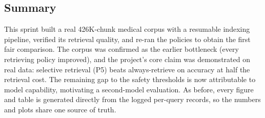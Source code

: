 \subsection{Summary}
\label{sec:week4-summary}

This sprint built a real 426K-chunk medical corpus with a resumable indexing
pipeline, verified its retrieval quality, and re-ran the policies to obtain the
first fair comparison. The corpus was confirmed as the earlier bottleneck (every
retrieving policy improved), and the project's core claim was demonstrated on real
data: selective retrieval (P5) beats always-retrieve on accuracy at half the
retrieval cost. The remaining gap to the safety thresholds is now attributable to
model capability, motivating a second-model evaluation. As before, every figure
and table is generated directly from the logged per-query records, so the numbers
and plots share one source of truth.
